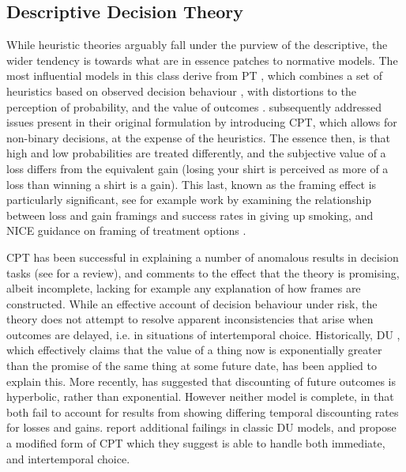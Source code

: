\subsection{Descriptive Decision Theory}\label{sub:descriptive_theories}

While heuristic theories arguably fall under the purview of the descriptive, the wider tendency is towards what are in essence patches to normative models. The most influential models in this class derive from \ac{PT} \citep{Kahneman1979}, which combines a set of heuristics based on observed decision behaviour \citep{Tversky1974}, with distortions to the perception of probability, and the value of outcomes \citep{Kahneman1984,Tversky1986}. \citet{Tversky1992} subsequently addressed issues present in their original formulation by introducing \ac{CPT}, which allows for non-binary decisions, at the expense of the heuristics. The essence then, is that high and low probabilities are treated differently, and the subjective value of a loss differs from the equivalent gain (losing your shirt is perceived as more of a loss than winning a shirt is a gain).
This last, known as the framing effect is particularly significant, see for example work by \citet{Toll2007} examining the relationship between loss and gain framings and success rates in giving up smoking, and \ac{NICE} guidance on framing of treatment options \citep{NICE2007}.

\ac{CPT} has been successful in explaining a number of anomalous results in decision tasks (see \citet{Camerer2004a} for a review), and \citet{Thaler2000} comments to the effect that the theory is promising, albeit incomplete, lacking for example any explanation of how frames are constructed. While an effective account of decision behaviour under risk, the theory does not attempt to resolve apparent inconsistencies that arise when outcomes are delayed, i.e. in situations of intertemporal choice. Historically, \ac{DU} \citep{Samuelson1937}, which effectively claims that the value of a thing now is exponentially greater than the promise of the same thing at some future date, has been applied to explain this. More recently, \citet{Ainslie1991} has suggested that discounting of future outcomes is hyperbolic, rather than exponential. However neither model is complete, in that both fail to account for results from \citet{Thaler1981} showing differing temporal discounting rates for losses and gains. \citet{Loewenstein1992} report additional failings in classic \ac{DU} models, and propose a modified form of \ac{CPT} which they suggest is able to handle both immediate, and intertemporal choice.